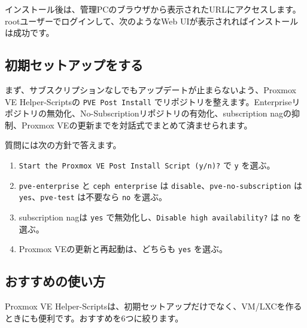 インストール後は、管理PCのブラウザから表示されたURLにアクセスします。rootユーザーでログインして、次のようなWeb UIが表示されればインストールは成功です。


\subsection{初期セットアップをする}

まず、サブスクリプションなしでもアップデートが止まらないよう、Proxmox VE Helper-Scriptsの \texttt{PVE Post Install} でリポジトリを整えます\cite{proxmox-helper-scripts}。Enterpriseリポジトリの無効化、No-Subscriptionリポジトリの有効化、subscription nagの抑制、Proxmox VEの更新までを対話式でまとめて済ませられます。



質問には次の方針で答えます。
\begin{enumerate}
\item \texttt{Start the Proxmox VE Post Install Script (y/n)?} で \texttt{y} を選ぶ。
\item \texttt{pve-enterprise} と \texttt{ceph enterprise} は \texttt{disable}、\texttt{pve-no-subscription} は \texttt{yes}、\texttt{pve-test} は不要なら \texttt{no} を選ぶ。
\item subscription nagは \texttt{yes} で無効化し、\texttt{Disable high availability?} は \texttt{no} を選ぶ。
\item Proxmox VEの更新と再起動は、どちらも \texttt{yes} を選ぶ。
\end{enumerate}

\subsection{おすすめの使い方}

Proxmox VE Helper-Scriptsは、初期セットアップだけでなく、VM/LXCを作るときにも便利です\cite{proxmox-helper-scripts}。おすすめを6つに絞ります。


